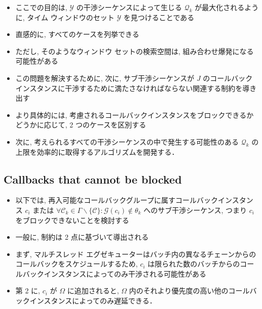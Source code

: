 \begin{frame}{}
    \begin{itemize}
        \item ここでの目的は, $\mathcal{Y}$ の干渉シーケンスによって生じる $\mathcal{Q}_{k}$ が最大化されるように, タイム ウィンドウのセット $\mathcal{Y}$ を見つけることである
        \item 直感的に, すべてのケースを列挙できる
        \item ただし, そのようなウィンドウ セットの検索空間は, 組み合わせ爆発になる可能性がある
        \item この問題を解決するために, 次に, サブ干渉シーケンスが $J$ のコールバックインスタンスに干渉するために満たさなければならない関連する制約を導き出す
        \item より具体的には, 考慮されるコールバックインスタンスをブロックできるかどうかに応じて, 2 つのケースを区別する
        \item 次に, 考えられるすべての干渉シーケンスの中で発生する可能性のある $\mathcal{Q}_{k}$ の上限を効率的に取得するアルゴリズムを開発する．
    \end{itemize}
\end{frame}


\subsection{Callbacks that cannot be blocked}
\label{ssec: callbacks_that_cannot_be_blocked}

\begin{frame}{}
    \begin{itemize}
        \item 以下では, 再入可能なコールバックグループに属すコールバックインスタンス $c_{i}$ または $\forall \mathcal{C}_{k} \in \Gamma \backslash\{\mathcal{C}\}: \mathcal{G}\left(c_{i}\right) \notin \theta_{k}$ へのサブ干渉シーケンス, つまり $c_{i}$ をブロックできないことを検討する
        \item 一般に, 制約は 2 点に基づいて導出される
        \item まず, マルチスレッド エグゼキューターはバッチ内の異なるチェーンからのコールバックをスケジュールするため, $c_{i}$ は限られた数のバッチからのコールバックインスタンスによってのみ干渉される可能性がある
        \item 第 2 に, $c_{i}$ が $\Omega$ に追加されると, $\Omega$ 内のそれより優先度の高い他のコールバックインスタンスによってのみ遅延できる．
    \end{itemize}
\end{frame}

